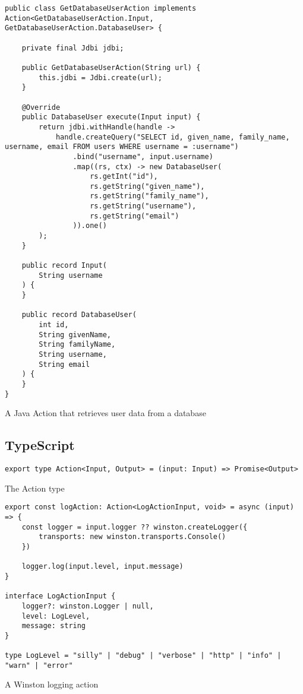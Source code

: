 \begin{listing}[H]
\begin{verbatim}
public class GetDatabaseUserAction implements Action<GetDatabaseUserAction.Input, GetDatabaseUserAction.DatabaseUser> {
    
    private final Jdbi jdbi;
    
    public GetDatabaseUserAction(String url) {
        this.jdbi = Jdbi.create(url);
    }
    
    @Override
    public DatabaseUser execute(Input input) {
        return jdbi.withHandle(handle ->
            handle.createQuery("SELECT id, given_name, family_name, username, email FROM users WHERE username = :username")
                .bind("username", input.username)
                .map((rs, ctx) -> new DatabaseUser(
                    rs.getInt("id"),
                    rs.getString("given_name"),
                    rs.getString("family_name"),
                    rs.getString("username"),
                    rs.getString("email")
                )).one()
        );
    }
    
    public record Input(
        String username
    ) {
    }
    
    public record DatabaseUser(
        int id,
        String givenName,
        String familyName,
        String username,
        String email
    ) {
    }
}
\end{verbatim}
\caption{A Java Action that retrieves user data from a database}
\end{listing}

\subsection{TypeScript}

\begin{listing}[H]
\begin{verbatim}
export type Action<Input, Output> = (input: Input) => Promise<Output>
\end{verbatim}
\caption{The Action type}
\end{listing}

\begin{listing}[H]
\begin{verbatim}
export const logAction: Action<LogActionInput, void> = async (input) => {
    const logger = input.logger ?? winston.createLogger({
        transports: new winston.transports.Console()
    })
    
    logger.log(input.level, input.message)
}

interface LogActionInput {
    logger?: winston.Logger | null,
    level: LogLevel,
    message: string
}

type LogLevel = "silly" | "debug" | "verbose" | "http" | "info" | "warn" | "error"
\end{verbatim}
\caption{A Winston logging action}
\end{listing}

